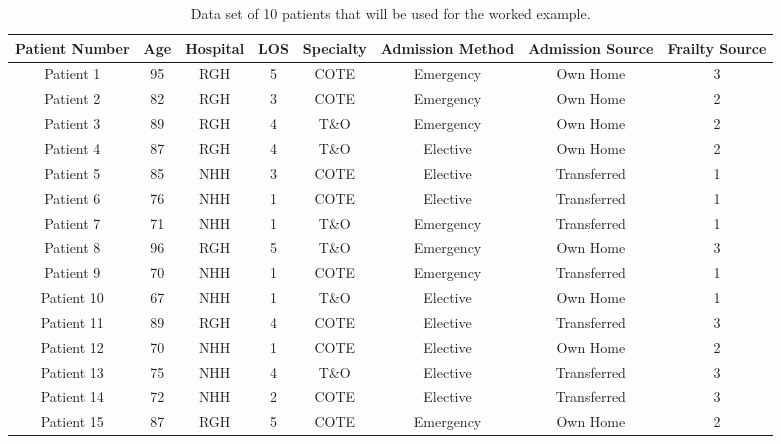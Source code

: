 \documentclass[../thesis.tex]{subfiles}
\begin{document}
\begin{table}[h!]
    \centering
    \begin{adjustbox}{width=\columnwidth}
    \begin{tabular}{cccccccc}\toprule
       \textbf{Patient Number}  & \textbf{Age} & \textbf{Hospital} & \textbf{LOS} & \textbf{Specialty} &\textbf{Admission Method} & \textbf{Admission Source} & \textbf{Frailty Source} \\\midrule
        Patient 1 & 95 & RGH & 5 & COTE & Emergency & Own Home & 3 \\ 
        Patient 2 & 82 & RGH & 3 & COTE & Emergency & Own Home & 2 \\
        Patient 3 & 89 & RGH & 4& T\&O & Emergency & Own Home & 2 \\
        Patient 4 & 87 & RGH & 4 & T\&O & Elective & Own Home & 2 \\
        Patient 5 & 85 & NHH & 3 & COTE & Elective & Transferred & 1 \\
        Patient 6 & 76 & NHH & 1 & COTE & Elective & Transferred & 1\\
        Patient 7 & 71 & NHH & 1 & T\&O & Emergency & Transferred & 1 \\
        Patient 8 & 96 & RGH & 5 & T\&O & Emergency & Own Home & 3 \\
        Patient 9 & 70 & NHH & 1 & COTE & Emergency & Transferred & 1\\
        Patient 10 & 67 & NHH & 1 & T\&O & Elective & Own Home & 1\\
        Patient 11 & 89 & RGH & 4 & COTE & Elective & Transferred & 3\\
        Patient 12 & 70 & NHH & 1 & COTE & Elective & Own Home & 2\\
        Patient 13 & 75 & NHH & 4 & T\&O & Elective & Transferred & 3\\
        Patient 14 & 72 & NHH & 2 & COTE & Elective & Transferred & 3\\
        Patient 15 & 87 & RGH & 5 & COTE & Emergency & Own Home & 2\\\bottomrule
    \end{tabular}
    \end{adjustbox}
    \caption{Data set of 10 patients that will be used for the worked example.}
    \label{tab:tablefour1}
\end{table}
\end{document}
